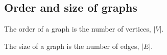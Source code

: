 
\subsection{Order and size of graphs}

The order of a graph is the number of vertices, \(|V|\).

The size of a graph is the number of edges, \(|E|\).

